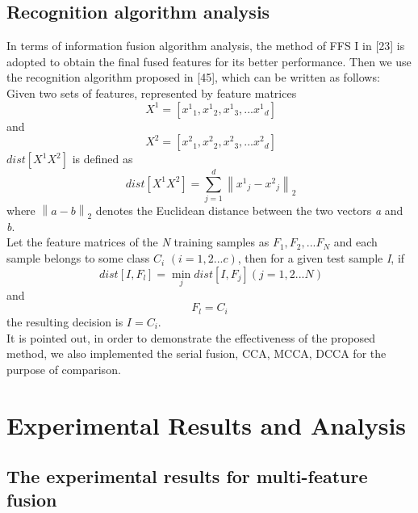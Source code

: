 \documentclass[journal]{IEEEtran}
\begin{document}
\subsection{Recognition algorithm analysis}
In terms of information fusion algorithm analysis, the method of FFS I in [23] is adopted to obtain the final
fused features for its better performance. Then we use the recognition algorithm proposed in [45], which can be written
as follows: \\\indent
Given two sets of features, represented by feature matrices
\begin{equation} \ {X^1} = [{x^1}_1,{x^1}_2,{x^1}_3,...{x^1}_d] \end{equation}
and
\begin{equation} \ {X^2} = [{x^2}_1,{x^2}_2,{x^2}_3,...{x^2}_d] \end{equation}
$dist[{X^1}{X^2}]$ is defined as
\begin{equation} \ dist[{X^1}{X^2}] = \sum\limits_{j = 1}^d {{{\left\| {{x^1}_j - {x^2}_j} \right\|}_2}} \end{equation}
where ${\left\| {a - b} \right\|_2}$ denotes the Euclidean distance between the two vectors \emph{a} and \emph{b}. \\\indent
Let the feature matrices of the \emph{N} training samples as ${F_1},{F_2},...{F_N}$ and each sample belongs to some class
${C_i}$ $ (i = 1,2...c )$, then for a given test sample \emph{I},
if
\begin{equation} \;dist[I,{F_l}] = \mathop {\min}\limits_j dist[I,{F_j}] (j = 1,2...N )\end{equation}
and
\begin{equation}{F_l} = {C_i}\end{equation}
the resulting decision is $I = {C_i}$. \\\indent
It is pointed out, in order to demonstrate the effectiveness of the proposed method, we also implemented the serial fusion, CCA, MCCA, DCCA for the purpose of comparison.
\section{Experimental Results and Analysis}
\subsection{The experimental results for multi-feature fusion}
\end{document}
